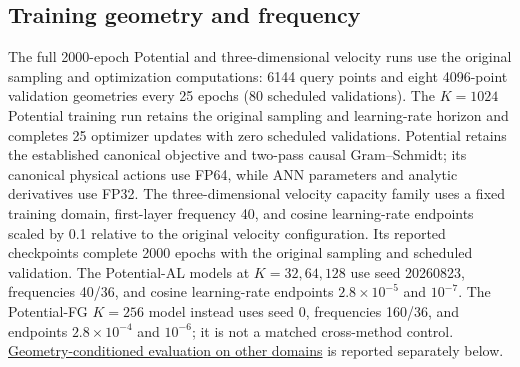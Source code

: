 \subsection{Training geometry and frequency}
The full 2000-epoch Potential and three-dimensional velocity runs use the original sampling and optimization computations: 6144 query points and eight 4096-point validation geometries every 25 epochs (80 scheduled validations). The $K=1024$ Potential training run retains the original sampling and learning-rate horizon and completes 25 optimizer updates with zero scheduled validations. Potential retains the established canonical objective and two-pass causal Gram--Schmidt; its canonical physical actions use FP64, while ANN parameters and analytic derivatives use FP32. The three-dimensional velocity capacity family uses a fixed training domain, first-layer frequency 40, and cosine learning-rate endpoints scaled by 0.1 relative to the original velocity configuration. Its reported checkpoints complete 2000 epochs with the original sampling and scheduled validation. The Potential-AL models at $K=32,64,128$ use seed 20260823, frequencies 40/36, and cosine learning-rate endpoints $2.8\times10^{-5}$ and $10^{-7}$. The Potential-FG $K=256$ model instead uses seed 0, frequencies 160/36, and endpoints $2.8\times10^{-4}$ and $10^{-6}$; it is not a matched cross-method control. \hyperref[app:unseen-geometry]{Geometry-conditioned evaluation on other domains} is reported separately below.


